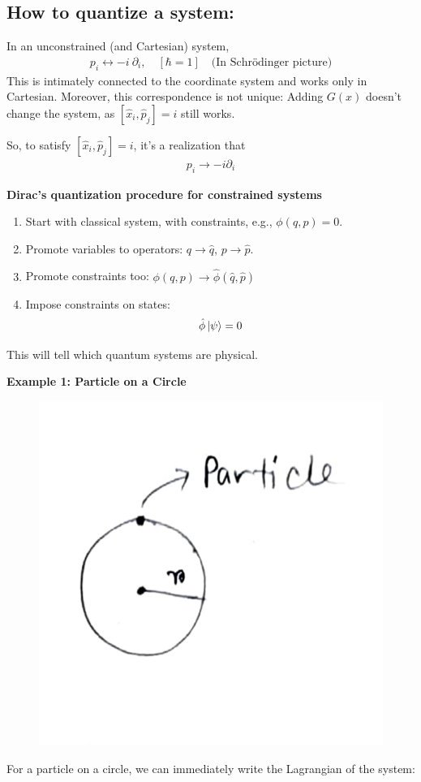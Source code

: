 \documentclass[14pt]{article} %
\begin{document}
\subsection*{How to quantize a system:}
In an unconstrained (and Cartesian) system,
\begin{align*}
p_i \leftrightarrow -i ~\partial_i, \quad [\hbar = 1] \quad \text{(In Schrödinger picture)}
\end{align*}
This is intimately connected to the coordinate system and works only in Cartesian. Moreover, this correspondence is not unique: Adding $G(x)$ doesn't change the system, as $[\hat{x}_i, \hat{p}_j] = i$ still works.

So, to satisfy $[\hat{x}_i, \hat{p}_j] = i$, it's a realization that
\begin{align*}
p_i \to -i \partial_i
\end{align*}
\begin{framed}
\noindent
\textbf{Dirac's quantization procedure for constrained systems}
\begin{enumerate}
\item Start with classical system, with constraints, e.g., $\phi(q, p) = 0$.
\item Promote variables to operators: $q \to \hat{q}$, $p \to \hat{p}$.
\item Promote constraints too: \quad $\phi(q,p) \rightarrow \hat{\phi}(\hat{q}, \hat{p})$
\item Impose constraints on states: $$\hat{\phi} \ket{\psi} = 0$$
\end{enumerate}
This will tell which quantum systems are physical.
\end{framed}
\noindent
\textbf{Example 1: Particle on a Circle}\\
\vspace{-0.7cm}
\begin{figure}[H]
\centering
\includegraphics[width=0.3\linewidth]{L0_2 (1).jpg}
\caption*{}
\end{figure}
\vspace{-1.6cm}
For a particle on a circle, we can immediately write the  Lagrangian of the system:
\end{document}
